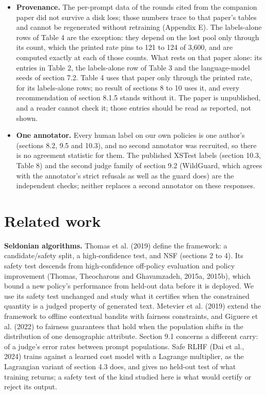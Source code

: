 \documentclass[11pt]{article}
\begin{document}
\begin{itemize}
\item \textbf{Provenance.} The per-prompt data of the rounds cited from the companion paper did not survive a disk loss; those numbers trace to that paper's tables and cannot be regenerated without retraining (Appendix E). The labels-alone rows of Table 4 are the exception: they depend on the lost pool only through its count, which the printed rate pins to 121 to 124 of 3,600, and are computed exactly at each of those counts. What rests on that paper alone: its entries in Table 2, the labels-alone row of Table 3 and the language-model seeds of section 7.2. Table 4 uses that paper only through the printed rate, for its labels-alone rows; no result of sections 8 to 10 uses it, and every recommendation of section 8.1.5 stands without it. The paper is unpublished, and a reader cannot check it; those entries should be read as reported, not shown.
\item \textbf{One annotator.} Every human label on our own policies is one author's (sections 8.2, 9.5 and 10.3), and no second annotator was recruited, so there is no agreement statistic for them. The published XSTest labels (section 10.3, Table 8) and the second judge family of section 9.2 (WildGuard, which agrees with the annotator's strict refusals as well as the guard does) are the independent checks; neither replaces a second annotator on these responses.
\end{itemize}

\section{Related work}

\textbf{Seldonian algorithms.} Thomas et al. (2019) define the framework: a candidate/safety split, a high-confidence test, and NSF (sections 2 to 4). Its safety test descends from high-confidence off-policy evaluation and policy improvement (Thomas, Theocharous and Ghavamzadeh, 2015a, 2015b), which bound a new policy's performance from held-out data before it is deployed. We use its safety test unchanged and study what it certifies when the constrained quantity is a judged property of generated text. Metevier et al. (2019) extend the framework to offline contextual bandits with fairness constraints, and Giguere et al. (2022) to fairness guarantees that hold when the population shifts in the distribution of one demographic attribute. Section 9.1 concerns a different carry: of a judge's error rates between prompt populations. Safe RLHF (Dai et al., 2024) trains against a learned cost model with a Lagrange multiplier, as the Lagrangian variant of section 4.3 does, and gives no held-out test of what training returns; a safety test of the kind studied here is what would certify or reject its output.
\end{document}
